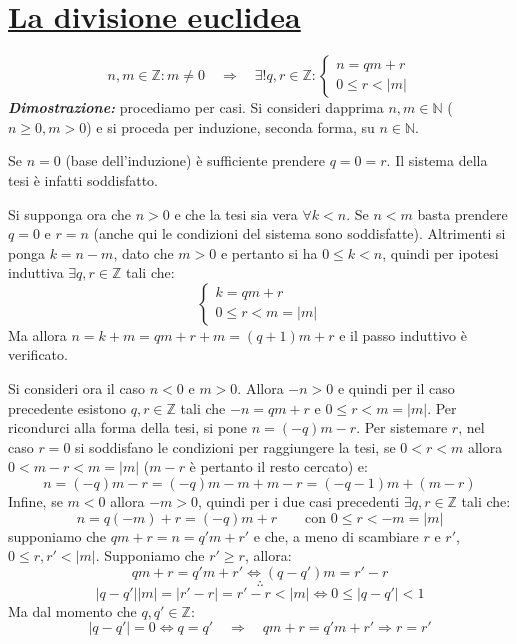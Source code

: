 \documentclass[oneside]{book}
\begin{document}
\section{\underline{La divisione euclidea}}
\begin{tcolorbox}[enhanced, breakable, title={Teorema della divisione euclidea}]
\[
    n,m \in \mathbb{Z}: m\not=0 \quad \Longrightarrow \quad \exists! q,r\in \mathbb{Z}:
    \begin{cases}
        n = qm + r\\
        0 \leq r < |m|
    \end{cases}
\]
\emph{\textbf{Dimostrazione:}}  procediamo
per casi. Si consideri dapprima $n,m \in \mathbb{N}$ ($n \geq 0, m > 0$)
e si proceda per induzione, seconda forma, su $n\in\mathbb{N}$.

Se $n = 0$ (base dell'induzione) è sufficiente prendere $q = 0 = r$. Il
sistema della tesi è infatti soddisfatto.

Si supponga ora che $n > 0$ e che la tesi sia vera $\forall k < n$.
Se $n < m$ basta prendere $q = 0$ e $r = n$ (anche qui le condizioni
del sistema sono soddisfatte). Altrimenti si ponga $k = n - m$, dato
che $m > 0$ e pertanto si ha $0 \leq k < n$,
quindi per ipotesi induttiva $\exists q,r \in \mathbb{Z}$ tali che:
\[ 
    \begin{cases}
        k = qm + r\\
        0 \leq r < m = |m|
    \end{cases}
\]
Ma allora $n = k + m = qm + r + m = (q+1)m + r$ e il passo induttivo
è verificato.

Si consideri ora il caso $n < 0$ e $m > 0$. Allora $-n > 0$ e quindi
per il caso precedente esistono $q,r \in \mathbb{Z}$ tali che
$-n = qm + r$ e $0 \leq r < m = |m|$. Per ricondurci alla forma della
tesi, si pone $n = (-q)m - r$. Per sistemare $r$, nel caso $r = 0$ si
soddisfano le condizioni per raggiungere la tesi, se $0 < r < m$ allora
$0 < m - r < m = |m|$ ($m - r$ è pertanto il resto cercato) e:
\[ n = (-q)m - r = (-q)m - m + m - r = (-q - 1)m + (m - r) \]
Infine, se $m < 0$ allora $-m > 0$, quindi per i due casi precedenti
$\exists q,r \in \mathbb{Z}$ tali che:
\[ n = q(-m) + r = (-q)m + r \qquad \text{con } 0 \leq r < -m = |m| \]
 supponiamo che
$qm + r = n = q'm + r'$ e che, a meno di scambiare $r$ e $r'$, $0 \leq r,r' < |m|$.
Supponiamo che $r' \geq r$, allora:
\[ qm + r = q'm + r' \Longleftrightarrow (q - q')m = r'-r \]
\[ \therefore \]
\[ |q-q'||m| = |r'-r| = r'-r < |m| \Longleftrightarrow 0 \leq |q-q'| < 1 \]
Ma dal momento che $q,q' \in \mathbb{Z}$:
\[
    |q-q'| = 0 \Longleftrightarrow q = q' \quad \Longrightarrow \quad qm + r = q'm + r' \Longrightarrow r = r'
\]

\cvd
\end{tcolorbox}
\end{document}
